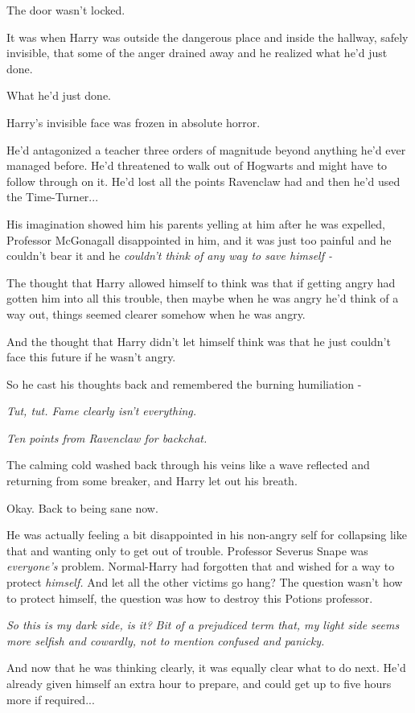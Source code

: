 The door wasn't locked.

It was when Harry was outside the dangerous place and inside the hallway, safely invisible, that some of the anger drained away and he realized what he'd just done.

What he'd just done.

Harry's invisible face was frozen in absolute horror.

He'd antagonized a teacher three orders of magnitude beyond anything he'd ever managed before. He'd threatened to walk out of Hogwarts and might have to follow through on it. He'd lost all the points Ravenclaw had and then he'd used the Time-Turner...

His imagination showed him his parents yelling at him after he was expelled, Professor McGonagall disappointed in him, and it was just too painful and he couldn't bear it and he \emph{couldn't think of any way to save himself -}

The thought that Harry allowed himself to think was that if getting angry had gotten him into all this trouble, then maybe when he was angry he'd think of a way out, things seemed clearer somehow when he was angry.

And the thought that Harry didn't let himself think was that he just couldn't face this future if he wasn't angry.

So he cast his thoughts back and remembered the burning humiliation -

\emph{Tut, tut. Fame clearly isn't everything.}

\emph{Ten points from Ravenclaw for backchat.}

The calming cold washed back through his veins like a wave reflected and returning from some breaker, and Harry let out his breath.

Okay. Back to being sane now.

He was actually feeling a bit disappointed in his non-angry self for collapsing like that and wanting only to get out of trouble. Professor Severus Snape was \emph{everyone's} problem. Normal-Harry had forgotten that and wished for a way to protect \emph{himself.} And let all the other victims go hang? The question wasn't how to protect himself, the question was how to destroy this Potions professor.

\emph{So this is my dark side, is it?} \emph{Bit of a prejudiced term that, my light side seems more selfish and cowardly, not to mention confused and panicky.}

And now that he was thinking clearly, it was equally clear what to do next. He'd already given himself an extra hour to prepare, and could get up to five hours more if required...

